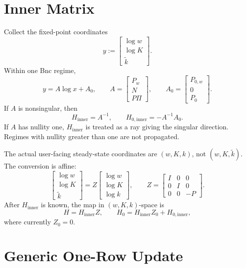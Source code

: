 \documentclass[11pt]{article}
\newcommand{\logx}{\log x}
\begin{document}
\section{Inner Matrix}

Collect the fixed-point coordinates
\[
    y :=
    \begin{bmatrix}
        \log w\\
        \log K\\
        \tilde k
    \end{bmatrix}.
\]
Within one Bnc regime,
\[
    y = A\logx + A_0,
    \qquad
    A =
    \begin{bmatrix}
        P_w\\
        N\\
        P\Pi
    \end{bmatrix},
    \qquad
    A_0 =
    \begin{bmatrix}
        P_{0,w}\\
        0\\
        P_0
    \end{bmatrix}.
\]
If \(A\) is nonsingular, then
\[
    H_{\mathrm{inner}}=A^{-1},
    \qquad
    H_{0,\mathrm{inner}}=-A^{-1}A_0 .
\]
If \(A\) has nullity one, \(H_{\mathrm{inner}}\) is treated as a ray giving the
singular direction.  Regimes with nullity greater than one are not propagated.

The actual user-facing steady-state coordinates are \((w,K,k)\), not
\((w,K,\tilde k)\).  The conversion is affine:
\[
    \begin{bmatrix}
        \log w\\
        \log K\\
        \tilde k
    \end{bmatrix}
    =
    Z
    \begin{bmatrix}
        \log w\\
        \log K\\
        \log k
    \end{bmatrix},
    \qquad
    Z =
    \begin{bmatrix}
        I & 0 & 0\\
        0 & I & 0\\
        0 & 0 & -P
    \end{bmatrix}.
\]
After \(H_{\mathrm{inner}}\) is known, the map in \((w,K,k)\)-space is
\[
    H = H_{\mathrm{inner}}Z,
    \qquad
    H_0 = H_{\mathrm{inner}}Z_0 + H_{0,\mathrm{inner}},
\]
where currently \(Z_0=0\).

\section{Generic One-Row Update}
\end{document}
